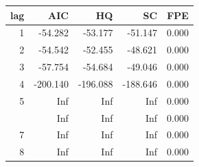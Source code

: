 \begin{tabular}{rrrrr}
\toprule
lag & AIC & HQ & SC & FPE\\
\midrule
1 & -54.282 & -53.177 & -51.147 & 0.000\\
2 & -54.542 & -52.455 & -48.621 & 0.000\\
3 & -57.754 & -54.684 & -49.046 & 0.000\\
4 & -200.140 & -196.088 & -188.646 & 0.000\\
5 & Inf & Inf & Inf & 0.000\\
\addlinespace
6 & Inf & Inf & Inf & 0.000\\
7 & Inf & Inf & Inf & 0.000\\
8 & Inf & Inf & Inf & 0.000\\
\bottomrule
\end{tabular}
